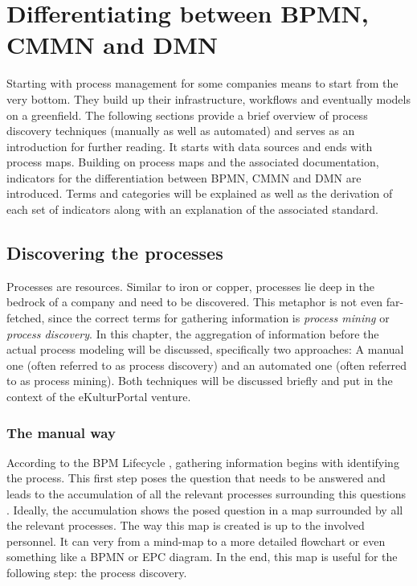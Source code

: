 \chapter{Differentiating between BPMN, CMMN and DMN}
\label{chapter:indicators}

Starting with process management for some companies means to start from the very bottom. They build up their infrastructure, workflows and eventually models on a greenfield. The following sections provide a brief overview of process discovery techniques (manually as well as automated) and serves as an introduction for further reading. It starts with data sources and ends with process maps. Building on process maps and the associated documentation, indicators for the differentiation between BPMN, CMMN and DMN are introduced. Terms and categories will be explained as well as the derivation of each set of indicators along with an explanation of the associated standard. 


\section{Discovering the processes}
\label{section:process_discovery}
Processes are resources. Similar to iron or copper, processes lie deep in the bedrock of a company and need to be discovered. This metaphor is not even far-fetched, since the correct terms for gathering information is \textit{process mining} or \textit{process discovery}.
In this chapter, the aggregation of information before the actual process modeling will be discussed, specifically two approaches: A manual one (often referred to as process discovery) and an automated one (often referred to as process mining). Both techniques will be discussed briefly and put in the context of the eKulturPortal venture. 

\subsection{The manual way}
According to the BPM Lifecycle \cite{Dumas2013}, gathering information begins with identifying the process. This first step poses the question that needs to be answered and leads to the accumulation of all the relevant processes surrounding this questions \cite{Dumas2013}. Ideally, the accumulation shows the posed question in a map surrounded by all the relevant processes. The way this map is created is up to the involved personnel. It can very from a mind-map to a more detailed flowchart or even something like a BPMN or EPC diagram. In the end, this map is useful for the following step: the process discovery. 

